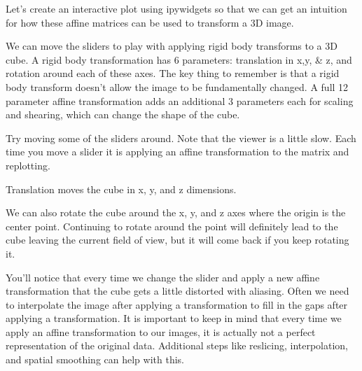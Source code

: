 \documentclass[letterpaper,10pt,english]{sphinxmanual}
\begin{document}
Let’s create an interactive plot using ipywidgets so that we can get an intuition for how these affine matrices can be used to transform a 3D image.

We can move the sliders to play with applying rigid body  transforms to a 3D cube. A rigid body transformation has 6 parameters: translation in x,y, \& z, and rotation around each of these axes. The key thing to remember is that a rigid body transform doesn’t allow the image to be fundamentally changed. A full 12 parameter affine transformation adds an additional 3 parameters each for scaling and shearing, which can change the shape of the cube.

Try moving some of the sliders around. Note that the viewer is a little slow. Each time you move a slider it is applying an affine transformation to the matrix and re\sphinxhyphen{}plotting.

Translation moves the cube in x, y, and z dimensions.

We can also rotate the cube around the x, y, and z axes where the origin is the center point. Continuing to rotate around the point will definitely lead to the cube leaving the current field of view, but it will come back if you keep rotating it.

You’ll notice that every time we change the slider and apply a new affine transformation that the cube gets a little distorted with aliasing. Often we need to interpolate the image after applying a transformation to fill in the gaps after applying a transformation. It is important to keep in mind that every time we apply an affine transformation to our images, it is actually not a perfect representation of the original data. Additional steps like reslicing, interpolation, and spatial smoothing can help with this.
\end{document}
